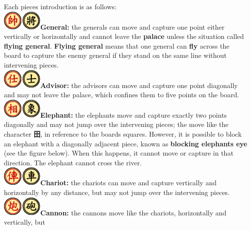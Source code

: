 \documentclass[12pt,a4paper]{article}
\begin{document}
\noindent
Each piece\textquotesingle s introduction is as follows:
\\\noindent
\textbf{\includegraphics{Xiangqi.assets/75px-Xiangqi_General.png}General:}
the generals can move and capture one point either vertically or
horizontally and cannot leave the \textbf{palace} unless the situation called
\textbf{flying general}. \textbf{Flying general} means that
one general can \textbf{fly} across the board to capture the enemy general if
they stand on the same line without intervening pieces.
\\\noindent
\textbf{\includegraphics{Xiangqi.assets/75px-Xiangqi_Advisor.png}Advisor:}
the advisors can move and capture one point diagonally and may not leave
the palace, which confines them to five points on the board.
\\\noindent
\textbf{\includegraphics{Xiangqi.assets/75px-Xiangqi_Elephant.png}Elephant:}
the elephants move and capture exactly two points diagonally and may not
jump over the intervening pieces; the move like the
character \textbf{田}, in reference to the board\textquotesingle s squares. 
However, it is possible to block an elephant with a diagonally adjacent piece, known as \textbf{blocking
elephant\textquotesingle s eye} (see the figure below). When this
happens, it cannot move or capture in that direction. The elephant cannot cross the river.
\\\noindent
\textbf{\includegraphics{Xiangqi.assets/75px-Xiangqi_Chariot.png}Chariot:}
the chariots can move and capture vertically and horizontally by any
distance, but may not jump over the intervening pieces.
\\\noindent
\textbf{\includegraphics{Xiangqi.assets/75px-Xiangqi_Cannon.png}Cannon:}
the cannons move like the chariots, horizontally and vertically, but
\end{document}
